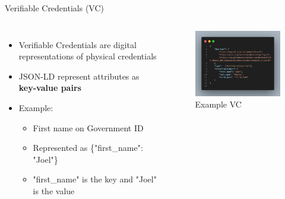 \documentclass[
	english,%
	authorontitle=true,
	]{bfhbeamer}
\begin{document}
\begin{frame}{Verifiable Credentials (VC)}
    \begin{columns}[onlytextwidth,T]
        \column{70mm}  

    \begin{itemize}
        \item Verifiable Credentials are digital representations of physical credentials
        \item JSON-LD represent attributes as \textbf{key-value pairs}
        \item Example:
        \begin{itemize}
            \item First name on Government ID
            \item Represented as \{"first\_name": "Joel"\}
            \item "first\_name" is the key and "Joel" is the value
        \end{itemize}
    \end{itemize}

    \column{70mm}
    \begin{figure}
        \centering
        \includegraphics[width=70mm]{./img/VCexp.png}
        \caption{Example VC}
    \end{figure}

    \end{columns}
\end{frame}
\end{document}
